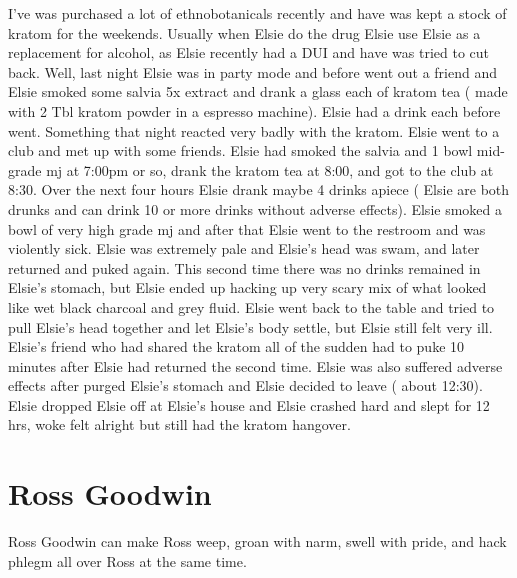 \documentclass[12pt]{book}
\begin{document}
I've was purchased a lot of ethnobotanicals recently and have was kept a stock of kratom for the weekends. Usually when Elsie do the drug Elsie use Elsie as a replacement for alcohol, as Elsie recently had a DUI and have was tried to cut back. Well, last night Elsie was in party mode and before went out a friend and Elsie smoked some salvia 5x extract and drank a glass each of kratom tea ( made with 2 Tbl kratom powder in a espresso machine). Elsie had a drink each before went. Something that night reacted very badly with the kratom. Elsie went to a club and met up with some friends. Elsie had smoked the salvia and 1 bowl mid-grade mj at 7:00pm or so, drank the kratom tea at 8:00, and got to the club at 8:30. Over the next four hours Elsie drank maybe 4 drinks apiece ( Elsie are both drunks and can drink 10 or more drinks without adverse effects). Elsie smoked a bowl of very high grade mj and after that Elsie went to the restroom and was violently sick. Elsie was extremely pale and Elsie's head was swam, and later returned and puked again. This second time there was no drinks remained in Elsie's stomach, but Elsie ended up hacking up very scary mix of what looked like wet black charcoal and grey fluid. Elsie went back to the table and tried to pull Elsie's head together and let Elsie's body settle, but Elsie still felt very ill. Elsie's friend who had shared the kratom all of the sudden had to puke 10 minutes after Elsie had returned the second time. Elsie was also suffered adverse effects after purged Elsie's stomach and Elsie decided to leave ( about 12:30). Elsie dropped Elsie off at Elsie's house and Elsie crashed hard and slept for 12 hrs, woke felt alright but still had the kratom hangover.



\chapter{Ross Goodwin}

Ross Goodwin can make Ross weep, groan with narm, swell with pride, and hack phlegm all over Ross at the same time.
\end{document}
